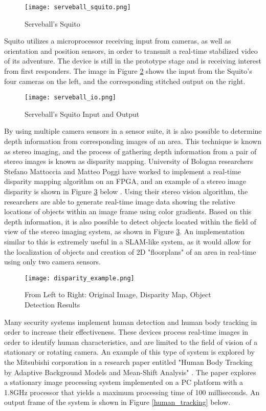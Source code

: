 \begin{figure}[H]
	\centerline{\texttt{[image: serveball\_squito.png]}}
	\caption{Serveball's Squito \cite{serveball}}
	\label{squito}
\end{figure}

Squito utilizes a microprocessor receiving input from cameras, as well as orientation and position sensors, in order to transmit a real-time stabilized video of its adventure. The device is still in the prototype stage and is receiving interest from first responders. The image in Figure \ref{squito_io} shows the input from the Squito's four cameras on the left, and the corresponding stitched output on the right.

\begin{figure}[H]
	\centerline{\texttt{[image: serveball\_io.png]}}
	\caption{Serveball's Squito Input and Output \cite{serveball}}
	\label{squito_io}
\end{figure}

By using multiple camera sensors in a sensor suite, it is also possible to determine depth information from corresponding images of an area. This technique is known as stereo imaging, and the process of gathering depth information from a pair of stereo images is known as disparity mapping. University of Bologna researchers Stefano Mattoccia and Matteo Poggi have worked to implement a real-time disparity mapping algorithm on an FPGA, and an example of a stereo image disparity is shown in Figure \ref{disparity_example} below \cite{mattoccia}. Using their stereo vision algorithm, the researchers are able to generate real-time image data showing the relative locations of objects within an image frame using color gradients. Based on this depth information, it is also possible to detect objects located within the field of view of the stereo imaging system, as shown in Figure \ref{disparity_example}. An implementation similar to this is extremely useful in a SLAM-like system, as it would allow for the localization of objects and creation of 2D "floorplans" of an area in real-time using only two camera sensors.

\begin{figure}[H]
	\centerline{\texttt{[image: disparity\_example.png]}}
	\caption{From Left to Right: Original Image, Disparity Map, Object Detection Results \cite{mattoccia}}
	\label{disparity_example}
\end{figure}

Many security systems implement human detection and human body tracking in order to increase their effectiveness. These devices process real-time images in order to identify human characteristics, and are limited to the field of vision of a stationary or rotating camera. An example of this type of system is explored by the Mitsubishi corporation in a research paper entitled "Human Body Tracking by Adaptive Background Models and Mean-Shift Analysis" \cite{porikli}. The paper explores a stationary image processing system implemented on a PC platform with a 1.8GHz processor that yields a maximum processing time of 100 milliseconds. An output frame of the system is shown in Figure \ref{human_tracking} below.

